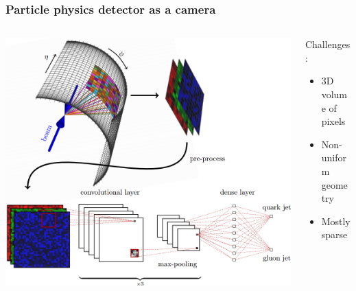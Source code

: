 \documentclass{beamer}
\begin{document}
\begin{frame}
    \frametitle{Particle physics detector as a camera}

    \begin{columns}
        \begin{column}{0.7\textwidth}
            \begin{center}
                \includegraphics[width=1.0\textwidth]{figures/sl-jets.png}
            \end{center}
        \end{column}
        \begin{column}{0.3\textwidth}
            \scriptsize
            Challenges:
            \begin{itemize}
                \item 3D volume of pixels
                \item Non-uniform geometry
                \item Mostly sparse
            \end{itemize}


\end{column}
\end{columns}
\end{frame}
\end{document}
